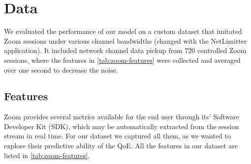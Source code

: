 \section{Data}
We evaluated the performance of our model on a custom dataset that imitated Zoom sessions under various channel bandwidths (changed with the NetLimitter application). It included network channel data pickup from 720 controlled Zoom sessions, where the features in \cref{tab:zoom-features} were collected and averaged over one second to decrease the noise.




\subsection{Features}
Zoom provides several metrics available for the end user through its' Software Developer Kit (SDK), which may be automatically extracted from the session stream in real time. For our dataset we captured all them, as we wanted to explore their predictive ability of the QoE. All the features in our dataset are listed in \cref{tab:zoom-features}.

